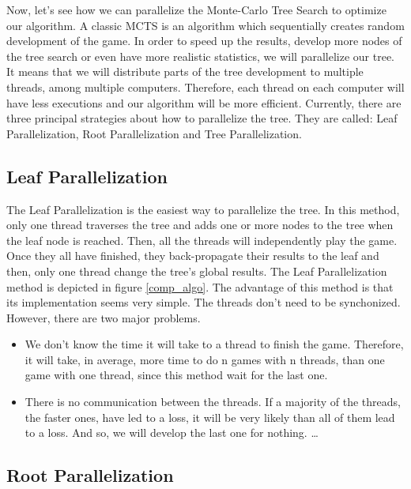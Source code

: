 Now, let’s see how we can parallelize the Monte-Carlo Tree Search to optimize our algorithm. A classic MCTS is an algorithm which sequentially creates random development of the game. In order to speed up the results, develop more nodes of the tree search or even have more realistic statistics, we will parallelize our tree. It means that we will distribute parts of the tree development to multiple threads, among multiple computers. Therefore, each thread on each computer will have less executions and our algorithm will be more efficient.
\newline
\newline
Currently, there are three principal strategies about how to parallelize the tree. They are called: Leaf Parallelization, Root Parallelization and Tree Parallelization\cite{parallel_comp, master_mcts_kozeleck}.

\subsection{Leaf Parallelization}

The Leaf Parallelization is the easiest way to parallelize the tree. In this method, only one thread traverses the tree and adds one or more nodes to the tree when the leaf node is reached. Then, all the threads will independently play the game. Once they all have finished, they back-propagate their results to the leaf and then, only one thread change the tree’s global results. The Leaf Parallelization method is depicted in figure \ref{comp_algo}.
\newline
\newline
The advantage of this method is that its implementation seems very simple. The threads don't need to be synchonized. However, there are two major problems.
\begin{itemize}
     \item We don’t know the time it will take to a thread to finish the game. Therefore, it will take, in average, more time to do n games with n threads, than one game with one thread, since this method wait for the last one.
     \item There is no communication between the threads. If a majority of the threads, the faster ones, have led to a loss, it will be very likely than all of them lead to a loss. And so, we will develop the last one for nothing. \ldots
  \end{itemize}

\subsection{Root Parallelization}

